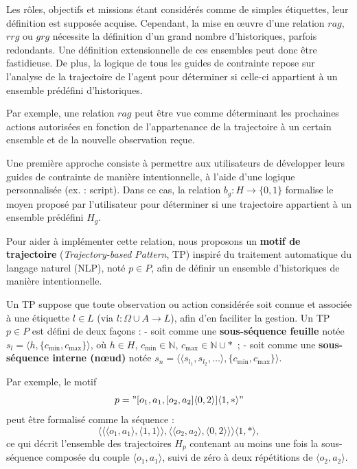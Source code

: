 Les rôles, objectifs et missions étant considérés comme de simples étiquettes, leur définition est supposée acquise. Cependant, la mise en œuvre d'une relation $rag$, $rrg$ ou $grg$ nécessite la définition d'un grand nombre d'historiques, parfois redondants. Une définition extensionnelle de ces ensembles peut donc être fastidieuse. De plus, la logique de tous les guides de contrainte repose sur l'analyse de la trajectoire de l'agent pour déterminer si celle-ci appartient à un ensemble prédéfini d'historiques.

Par exemple, une relation $rag$ peut être vue comme déterminant les prochaines actions autorisées en fonction de l'appartenance de la trajectoire à un certain ensemble et de la nouvelle observation reçue.

Une première approche consiste à permettre aux utilisateurs de développer leurs guides de contrainte de manière intentionnelle, à l'aide d'une logique personnalisée (ex. : script). Dans ce cas, la relation $b_g: H \to \{0,1\}$ formalise le moyen proposé par l'utilisateur pour déterminer si une trajectoire appartient à un ensemble prédéfini $H_g$.

Pour aider à implémenter cette relation, nous proposons un \textbf{motif de trajectoire} (\textit{Trajectory-based Pattern}, TP) inspiré du traitement automatique du langage naturel (NLP), noté $p \in P$, afin de définir un ensemble d'historiques de manière intentionnelle.

Un TP suppose que toute observation ou action considérée soit connue et associée à une étiquette $l \in L$ (via $l: \Omega \cup A \to L$), afin d'en faciliter la gestion. Un TP $p \in P$ est défini de deux façons :
- soit comme une \textbf{sous-séquence feuille} notée $s_l = \langle h, \{c_{\text{min}}, c_{\text{max}}\} \rangle$, où $h \in H$, $c_{\text{min}} \in \mathbb{N}$, $c_{\text{max}} \in \mathbb{N} \cup *$~;
- soit comme une \textbf{sous-séquence interne (nœud)} notée $s_n = \langle \langle s_{l_1}, s_{l_2}, \dots \rangle, \{c_{\text{min}}, c_{\text{max}}\} \rangle$.

Par exemple, le motif
\[
    p = "[o_1,a_1,[o_2,a_2]\langle0,2\rangle]\langle1,*\rangle"
\]
peut être formalisé comme la séquence :
\[
    \langle \langle \langle o_1,a_1 \rangle, \langle 1,1 \rangle \rangle, \langle \langle o_2,a_2 \rangle, \langle 0,2 \rangle \rangle \rangle \langle 1,* \rangle,
\]
ce qui décrit l'ensemble des trajectoires $H_p$ contenant au moins une fois la sous-séquence composée du couple $\langle o_1, a_1 \rangle$, suivi de zéro à deux répétitions de $\langle o_2, a_2 \rangle$.

